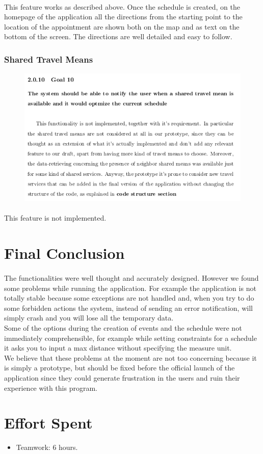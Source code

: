 \documentclass{article}
\begin{document}
			\paragraph{}This feature works as described above. Once the schedule is created, on the homepage of the application all the directions from the starting point to the location of the appointment are shown both on the map and as text on the bottom of the screen. The directions are well detailed and easy to follow.
			\subsubsection{Shared Travel Means}
			\begin{figure}[H]
			\includegraphics[width=\linewidth]{Images/Goals/Goal_10.png}
			\label{fig:G10}
			\end{figure}
			\paragraph{}This feature is not implemented.
\newpage
	\section{Final Conclusion}
		\paragraph{}The functionalities were well thought and accurately designed. However we found some problems while running the application. For example the application is not totally stable because some exceptions are not handled and, when you try to do some forbidden actions the system, instead of sending an error notification, will simply crash and you will lose all the temporary data.\\
Some of the options during  the creation of events and the schedule were not immediately comprehensible, for example while setting constraints for a schedule it asks you to input a max distance without specifying the measure unit.\\
We believe that these problems at the moment are not too concerning because it is simply a prototype, but should be fixed before the official launch of the application since they could generate frustration in the users and ruin their experience with this program.
\newpage
	\section{Effort Spent}
	\begin{itemize}
	\item{} Teamwork: 6 hours.
	\end{itemize}
\end{document}
